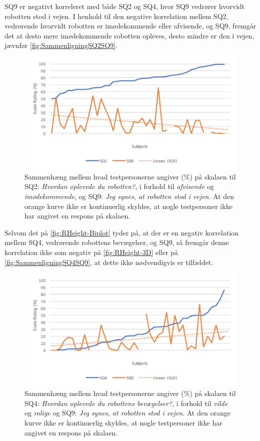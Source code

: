 \noindent
%
SQ9 er negativt korreleret med både SQ2 og SQ4, hvor SQ9 vedrører hvorvidt robotten stod i vejen. I henhold til den negative korrelation mellem SQ2, vedrørende hvorvidt robotten er imødekommende eller afvisende, og SQ9, fremgår det at desto mere imødekommende robotten opleves, desto mindre er den i vejen, jævnfør \autoref{fig:SammenligningSQ2SQ9}.
%
\begin{figure}[H]
	\centering
	\includegraphics[width=\textwidth]{Figure/Korrelationsgrafer/SQ2+SQ9}
	\caption{Sammenhæng mellem hvad testpersonerne angiver (\%) på skalaen til SQ2: \textit{Hvordan oplevede du robotten?}, i forhold til \textit{afvisende} og \textit{imødekommende}, og SQ9: \textit{Jeg synes, at robotten stod i vejen}. At den orange kurve ikke er kontinuerlig skyldes, at nogle testpersoner ikke har angivet en respons på skalaen.}
	\label{fig:SammenligningSQ2SQ9}
\end{figure}
\noindent
%
Selvom det på \autoref{fig:RHeight-Biplot} tyder på, at der er en negativ korrelation mellem SQ4, vedrørende robottens bevægelser, og SQ9, så fremgår denne korrelation ikke som negativ på \autoref{fig:RHeight-3D} eller på \autoref{fig:SammenligningSQ4SQ9}, at dette ikke nødvendigvis er tilfældet.
%
\begin{figure}[H]
	\centering
	\includegraphics[width=\textwidth]{Figure/Korrelationsgrafer/SQ4+SQ9}
	\caption{Sammenhæng mellem hvad testpersonerne angiver (\%) på skalaen til SQ4: \textit{Hvordan oplevede du robottens bevægelser?}, i forhold til \textit{vilde} og \textit{rolige} og SQ9: \textit{Jeg synes, at robotten stod i vejen}. At den orange kurve ikke er kontinuerlig skyldes, at nogle testpersoner ikke har angivet en respons på skalaen.}
	\label{fig:SammenligningSQ4SQ9}
\end{figure}
